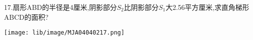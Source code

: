 17.扇形ABD的半径是4厘米,阴影部分$S_2$比阴影部分$S_1$大2.56平方厘米,求直角梯形ABCD的面积?

\begin{flushright}

    \texttt{[image: lib/image/MJA04040217.png]}

\end{flushright}



